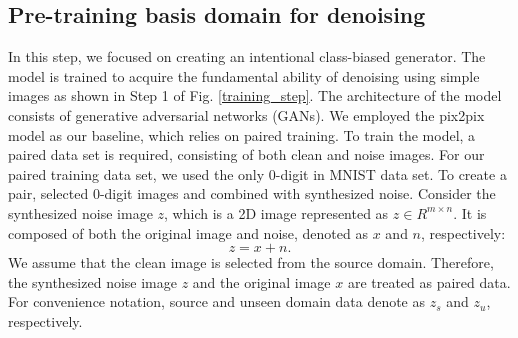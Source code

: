 \documentclass[lettersize,journal]{IEEEtran}
\begin{document}
\subsection{Pre-training basis domain for denoising}
In this step, we focused on creating an intentional class-biased generator. The model is trained to acquire the fundamental ability of denoising using simple images as shown in Step 1 of Fig. \ref{training_step}. The architecture of the model consists of generative adversarial networks (GANs). We employed the pix2pix\cite{isola2017image} model as our baseline, which relies on paired training.  To train the model, a paired data set is required, consisting of both clean and noise images. For our paired training data set, we used the only 0-digit in MNIST data set. To create a pair, selected 0-digit images and combined with synthesized noise. Consider the synthesized noise image $z$, which is a 2D image represented as $z \in R^{m\times n}$. It is composed of both the original image and noise, denoted as $x$ and $n$, respectively:
\begin{equation}
\label{deqn_ex1a}
z = x+n.
\end{equation}
We assume that the clean image is selected from the source domain. Therefore, the synthesized noise image $z$ and the original image $x$ are treated as paired data. For convenience notation, source and unseen domain data denote as $z_s$ and $z_u$, respectively.
\end{document}
